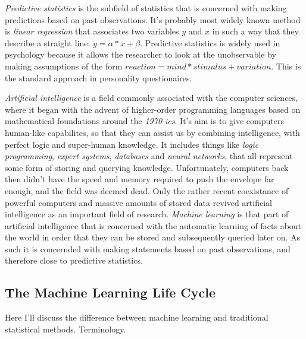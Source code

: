 \documentclass[a4paper,man,12pt,apacite]{apa6} %
\begin{document}
\emph{Predictive statistics} is the subfield of statistics that is
concerned with making predictions based on past observations.
It's probably most widely known method is \emph{linear regression} that
associates two variables \(y\) and \(x\) in such a way that they describe
a straight line: \(y = \alpha * x + \beta \).
Predictive statistics is widely used in psychology because it
allows the researcher to look at the unobservable by making
assumptions of the form \(reaction = mind * stimulus + variation\).
This is the standard approach in personality questionaires.

\emph{Artificial intelligence} is a field commonly associated with the
computer sciences, where it began with the advent of higher-order
programming languages based on mathematical foundations around the \emph{1970-ies}.
It's aim is to give computers human-like capabilites, so that they can assist
us by combining intelligence, with perfect logic and super-human knowledge.
It includes things like \emph{logic programming}, \emph{expert systems},
\emph{databases} and \emph{neural networks}, that all represent some form of
storing and querying knowledge.
Unfortunately, computers back then didn't have the speed and memory required
to push the envelope far enough, and the field was deemed dead.
Only the rather recent coexistance of powerful computers and massive amounts
of stored data revived artificial intelligence as an important field of
research.
\emph{Machine learning} is that part of artificial intelligence that
is concerned with the automatic learning of facts about the world in order
that they can be stored and subsequently queried later on.
As such it is concernded with making statements based on past observations,
and therefore close to predictive statistics. 

\subsection{The Machine Learning Life Cycle}
Here I'll discuss the difference between machine learning and traditional
statistical methods. Terminology.
\end{document}
